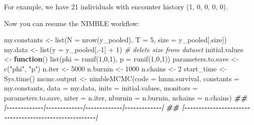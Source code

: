 \documentclass[
  12pt,
]{krantz}
\newenvironment{Shaded}{\begin{snugshade}}{\end{snugshade}}
\newcommand{\AttributeTok}[1]{\textcolor[rgb]{0.77,0.63,0.00}{#1}}
\newcommand{\CommentTok}[1]{\textcolor[rgb]{0.56,0.35,0.01}{\textit{#1}}}
\newcommand{\ControlFlowTok}[1]{\textcolor[rgb]{0.13,0.29,0.53}{\textbf{#1}}}
\newcommand{\DecValTok}[1]{\textcolor[rgb]{0.00,0.00,0.81}{#1}}
\newcommand{\DocumentationTok}[1]{\textcolor[rgb]{0.56,0.35,0.01}{\textbf{\textit{#1}}}}
\newcommand{\FunctionTok}[1]{\textcolor[rgb]{0.00,0.00,0.00}{#1}}
\newcommand{\NormalTok}[1]{#1}
\newcommand{\OtherTok}[1]{\textcolor[rgb]{0.56,0.35,0.01}{#1}}
\newcommand{\SpecialCharTok}[1]{\textcolor[rgb]{0.00,0.00,0.00}{#1}}
\newcommand{\StringTok}[1]{\textcolor[rgb]{0.31,0.60,0.02}{#1}}
\begin{document}
For example, we have 21 individuals with encounter history (1, 0, 0, 0, 0).

Now you can resume the NIMBLE workflow:

\begin{Shaded}
\begin{Highlighting}[]
\NormalTok{my.constants }\OtherTok{\textless{}{-}} \FunctionTok{list}\NormalTok{(}\AttributeTok{N =} \FunctionTok{nrow}\NormalTok{(y\_pooled), }\AttributeTok{T =} \DecValTok{5}\NormalTok{, }\AttributeTok{size =}\NormalTok{ y\_pooled[,}\StringTok{\textquotesingle{}size\textquotesingle{}}\NormalTok{])}
\NormalTok{my.data }\OtherTok{\textless{}{-}} \FunctionTok{list}\NormalTok{(}\AttributeTok{y =}\NormalTok{ y\_pooled[,}\SpecialCharTok{{-}}\DecValTok{1}\NormalTok{] }\SpecialCharTok{+} \DecValTok{1}\NormalTok{) }\CommentTok{\# delete size from dataset}
\NormalTok{initial.values }\OtherTok{\textless{}{-}} \ControlFlowTok{function}\NormalTok{() }\FunctionTok{list}\NormalTok{(}\AttributeTok{phi =} \FunctionTok{runif}\NormalTok{(}\DecValTok{1}\NormalTok{,}\DecValTok{0}\NormalTok{,}\DecValTok{1}\NormalTok{),}
                                  \AttributeTok{p =} \FunctionTok{runif}\NormalTok{(}\DecValTok{1}\NormalTok{,}\DecValTok{0}\NormalTok{,}\DecValTok{1}\NormalTok{))}
\NormalTok{parameters.to.save }\OtherTok{\textless{}{-}} \FunctionTok{c}\NormalTok{(}\StringTok{"phi"}\NormalTok{, }\StringTok{"p"}\NormalTok{)}
\NormalTok{n.iter }\OtherTok{\textless{}{-}} \DecValTok{5000}
\NormalTok{n.burnin }\OtherTok{\textless{}{-}} \DecValTok{1000}
\NormalTok{n.chains }\OtherTok{\textless{}{-}} \DecValTok{2}
\NormalTok{start\_time }\OtherTok{\textless{}{-}} \FunctionTok{Sys.time}\NormalTok{()}
\NormalTok{mcmc.output }\OtherTok{\textless{}{-}} \FunctionTok{nimbleMCMC}\NormalTok{(}\AttributeTok{code =}\NormalTok{ hmm.survival,}
                          \AttributeTok{constants =}\NormalTok{ my.constants,}
                          \AttributeTok{data =}\NormalTok{ my.data,}
                          \AttributeTok{inits =}\NormalTok{ initial.values,}
                          \AttributeTok{monitors =}\NormalTok{ parameters.to.save,}
                          \AttributeTok{niter =}\NormalTok{ n.iter,}
                          \AttributeTok{nburnin =}\NormalTok{ n.burnin,}
                          \AttributeTok{nchains =}\NormalTok{ n.chains)}
\DocumentationTok{\#\# |{-}{-}{-}{-}{-}{-}{-}{-}{-}{-}{-}{-}{-}|{-}{-}{-}{-}{-}{-}{-}{-}{-}{-}{-}{-}{-}|{-}{-}{-}{-}{-}{-}{-}{-}{-}{-}{-}{-}{-}|{-}{-}{-}{-}{-}{-}{-}{-}{-}{-}{-}{-}{-}|}
\DocumentationTok{\#\# |{-}{-}{-}{-}{-}{-}{-}{-}{-}{-}{-}{-}{-}{-}{-}{-}{-}{-}{-}{-}{-}{-}{-}{-}{-}{-}{-}{-}{-}{-}{-}{-}{-}{-}{-}{-}{-}{-}{-}{-}{-}{-}{-}{-}{-}{-}{-}{-}{-}{-}{-}{-}{-}{-}{-}|}

\end{Highlighting}
\end{Shaded}
\end{document}
